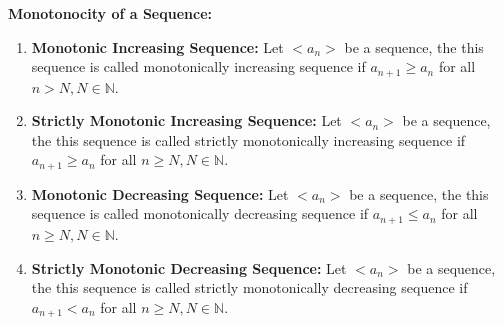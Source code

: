 \documentclass[a4paper]{article}
\begin{document}
\textbf{Monotonocity of a Sequence: }
\begin{enumerate}
    \item \textbf{Monotonic Increasing Sequence:} Let $<a_n>$ be a 
    sequence, the this sequence is called monotonically increasing 
    sequence if $a_{n+1} \ge a_n$ for all $n > N, N \in \mathbb{N}$.
    \item \textbf{Strictly Monotonic Increasing Sequence:} Let 
    $<a_n>$ be a sequence, the this sequence is called strictly 
    monotonically increasing sequence if $a_{n+1} \ge a_n$ for all 
    $n \ge N, N \in \mathbb{N}$. 
    \item \textbf{Monotonic Decreasing Sequence:} Let $<a_n>$ be a 
    sequence, the this sequence is called monotonically decreasing 
    sequence if $a_{n+1} \le a_n$ for all $n \ge N, N \in \mathbb{N}$.
    \item \textbf{Strictly Monotonic Decreasing Sequence:} Let 
    $<a_n>$ be a sequence, the this sequence is called strictly 
    monotonically decreasing sequence if $a_{n+1} < a_n$ for all 
    $n \ge N, N \in \mathbb{N}$.
\end{enumerate}
\end{document}
